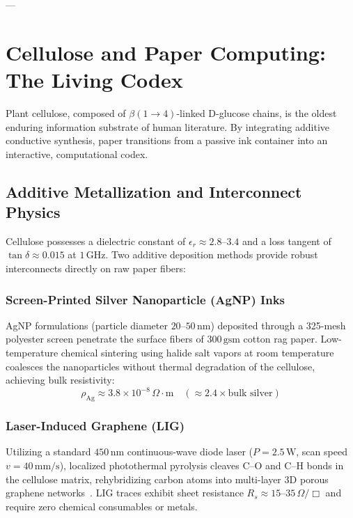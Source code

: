 \documentclass[10pt,twocolumn,letterpaper]{article}
\begin{document}
---

\section{Cellulose and Paper Computing: The Living Codex}

Plant cellulose, composed of $\beta(1\to 4)$-linked D-glucose chains, is the oldest enduring information substrate of human literature. By integrating additive conductive synthesis, paper transitions from a passive ink container into an interactive, computational codex.

\subsection{Additive Metallization and Interconnect Physics}

Cellulose possesses a dielectric constant of $\epsilon_r \approx 2.8\text{--}3.4$ and a loss tangent of $\tan\delta \approx 0.015$ at $1\,\text{GHz}$. Two additive deposition methods provide robust interconnects directly on raw paper fibers:

\subsubsection{Screen-Printed Silver Nanoparticle (AgNP) Inks}
AgNP formulations (particle diameter $20\text{--}50\,\text{nm}$) deposited through a 325-mesh polyester screen penetrate the surface fibers of $300\,\text{gsm}$ cotton rag paper. Low-temperature chemical sintering using halide salt vapors at room temperature coalesces the nanoparticles without thermal degradation of the cellulose, achieving bulk resistivity:
\begin{equation}
\rho_{\text{Ag}} \approx 3.8 \times 10^{-8}\,\Omega\cdot\text{m} \quad (\approx 2.4 \times \text{bulk silver})
\end{equation}

\subsubsection{Laser-Induced Graphene (LIG)}
Utilizing a standard $450\,\text{nm}$ continuous-wave diode laser ($P = 2.5\,\text{W}$, scan speed $v = 40\,\text{mm/s}$), localized photothermal pyrolysis cleaves $\text{C--O}$ and $\text{C--H}$ bonds in the cellulose matrix, rehybridizing carbon atoms into multi-layer 3D porous graphene networks~\cite{tour2014laser,chyan2018laser}. LIG traces exhibit sheet resistance $R_s \approx 15\text{--}35\,\Omega/\Box$ and require zero chemical consumables or metals.
\end{document}
